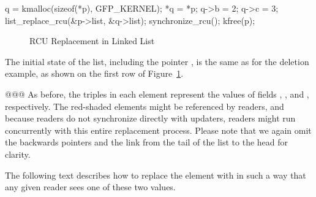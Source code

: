 
\begin{linelabel}
\begin{VerbatimN}[samepage=true,commandchars=\\\[\],firstnumber=15]
q = kmalloc(sizeof(*p), GFP_KERNEL);	\lnlbl[kmalloc]
*q = *p;				\lnlbl[copy]
q->b = 2;				\lnlbl[update1]
q->c = 3;				\lnlbl[update2]
list_replace_rcu(&p->list, &q->list);	\lnlbl[replace]
synchronize_rcu();			
kfree(p);				\lnlbl[kfree]
\end{VerbatimN}
\end{linelabel}

\begin{figure}[tbp]
\centering
{}
\caption{RCU Replacement in Linked List}
\label{fig:defer:RCU Replacement in Linked List}
\end{figure}

The initial state of the list, including the pointer ,
is the same as for the deletion example, as shown on the
first row of
Figure~\ref{fig:defer:RCU Replacement in Linked List}.

@@@ As before,
the triples in each element represent the values of fields ,
, and , respectively.
The red-shaded elements might be referenced by readers,
and because readers do not synchronize directly with updaters,
readers might run concurrently with this entire replacement process.
Please note that
we again omit the backwards pointers and the link from the tail
of the list to the head for clarity.

The following text describes how to replace the  element
with  in such a way that any given reader sees one of these
two values.

